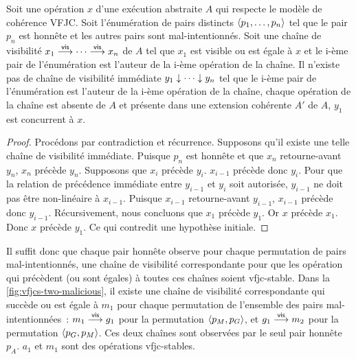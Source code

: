 \begin{proposition}
Soit une opération $x$ d'une exécution abstraite $A$ qui respecte le modèle de cohérence \ac{VFJC}.
Soit l'énumération de pairs distincts $\tuple*{p_1, \dotsc ,p_n}$ tel que le pair $p_n$ est honnête et les autres pairs sont mal-intentionnés.
Soit une chaîne de visibilité $x_1 \vis \dotsb \vis x_n$ de $A$ tel que $x_1$ est visible ou est égale à $x$ et le i-ème pair de l'énumération est l'auteur de la i-ème opération de la chaîne.
Il n'existe pas de chaîne de visibilité immédiate $y_1 \idr \dotsb \idr y_n$ tel que le i-ème pair de l'énumération est l'auteur de la i-ème opération de la chaîne, chaque opération de la chaîne est absente de $A$ et présente dans une extension cohérente $A'$ de $A$, $y_1$ est concurrent à $x$.
\end{proposition}

\begin{proof}
Procédons par contradiction et récurrence.
Supposons qu'il existe une telle chaîne de visibilité immédiate.
Puisque $p_n$ est honnête et que $x_n$ retourne-avant $y_n$, $x_n$ précède $y_n$.
Supposons que $x_i$ précède $y_i$.
$x_{i-1}$ précède donc $y_i$.
Pour que la relation de précédence immédiate entre $y_{i-1}$ et $y_i$ soit autorisée, $y_{i-1}$ ne doit pas être non-linéaire à $x_{i-1}$.
Puisque $x_{i-1}$ retourne-avant $y_{i-1}$, $x_{i-1}$ précède donc $y_{i-1}$.
Récursivement, nous concluons que $x_1$ précède $y_1$.
Or $x$ précède $x_1$.
Donc $x$ précède $y_1$.
Ce qui contredit une hypothèse initiale.
\end{proof}

Il suffit donc que chaque pair honnête observe pour chaque permutation de pairs mal-intentionnés, une chaîne de visibilité correspondante pour que les opération qui précèdent (ou sont égales) à toutes ces chaînes soient vfjc-stable.
Dans la \autoref{fig:vfjcs-two-malicious}, il existe une chaîne de visibilité correspondante qui succède ou est égale à $m_1$ pour chaque permutation de l'ensemble des pairs mal-intentionnées~: $m_1 \vis g_1$ pour la permutation $\tuple*{p_M, p_G}$, et $g_1 \vis m_2$ pour la permutation $\tuple*{p_G, p_M}$.
Ces deux chaînes sont observées par le seul pair honnête $p_A$.
$a_1$ et $m_1$ sont des opérations vfjc-stables.

